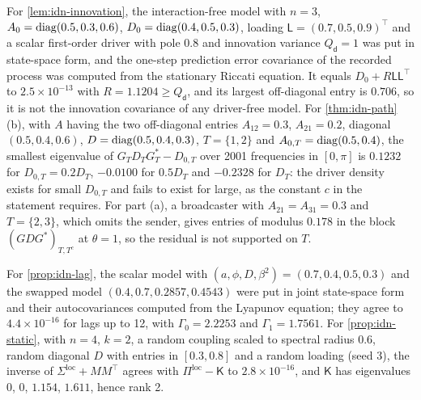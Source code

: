 \begin{numcheck}\label{chk:idn-path}
For \cref{lem:idn-innovation}, the interaction-free model with $n=3$, $A_0=\operatorname{diag}(0.5,0.3,0.6)$, $D_0=\operatorname{diag}(0.4,0.5,0.3)$, loading $\mathsf L=(0.7,0.5,0.9)^{\top}$ and a scalar first-order driver with pole $0.8$ and innovation variance $Q_{\mathsf d}=1$ was put in state-space form, and the one-step prediction error covariance of the recorded process was computed from the stationary Riccati equation. It equals $D_0+R\mathsf L\mathsf L^{\top}$ to $2.5\times10^{-13}$ with $R=1.1204\ge Q_{\mathsf d}$, and its largest off-diagonal entry is $0.706$, so it is not the innovation covariance of any driver-free model. For \cref{thm:idn-path}(b), with $A$ having the two off-diagonal entries $A_{12}=0.3$, $A_{21}=0.2$, diagonal $(0.5,0.4,0.6)$, $D=\operatorname{diag}(0.5,0.4,0.3)$, $T=\{1,2\}$ and $A_{0,T}=\operatorname{diag}(0.5,0.4)$, the smallest eigenvalue of $G_TD_TG_T^*-D_{0,T}$ over 2001 frequencies in $[0,\pi]$ is $0.1232$ for $D_{0,T}=0.2D_T$, $-0.0100$ for $0.5D_T$ and $-0.2328$ for $D_T$: the driver density exists for small $D_{0,T}$ and fails to exist for large, as the constant $c$ in the statement requires. For part (a), a broadcaster with $A_{21}=A_{31}=0.3$ and $T=\{2,3\}$, which omits the sender, gives entries of modulus $0.178$ in the block $(GDG^*)_{T,T^c}$ at $\theta=1$, so the residual is not supported on $T$.
\end{numcheck}

\begin{numcheck}\label{chk:idn-lag}
For \cref{prop:idn-lag}, the scalar model with $(a,\phi,D,\beta^2)=(0.7,0.4,0.5,0.3)$ and the swapped model $(0.4,0.7,0.2857,0.4543)$ were put in joint state-space form and their autocovariances computed from the Lyapunov equation; they agree to $4.4\times10^{-16}$ for lags up to 12, with $\Gamma_0=2.2253$ and $\Gamma_1=1.7561$. For \cref{prop:idn-static}, with $n=4$, $k=2$, a random coupling scaled to spectral radius $0.6$, random diagonal $D$ with entries in $[0.3,0.8]$ and a random loading (seed 3), the inverse of $\Sigma^{\mathrm{loc}}+MM^{\top}$ agrees with $\Pi^{\mathrm{loc}}-\mathsf K$ to $2.8\times10^{-16}$, and $\mathsf K$ has eigenvalues $0$, $0$, $1.154$, $1.611$, hence rank 2.
\end{numcheck}

